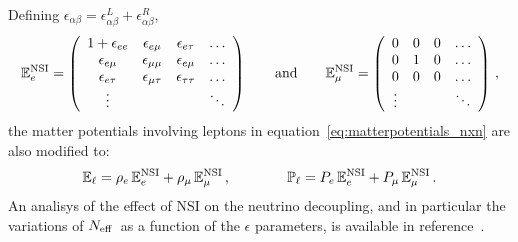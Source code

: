 \documentclass[notitlepage,nofootinbib,showpacs,preprintnumbers,amsmath,amssymb,superscriptaddress,prd,onecolumn]{revtex4-1}
\newcommand{\Neff}{\ensuremath{N_{\rm eff}}}
\begin{document}
Defining $\epsilon_{\alpha\beta}=\epsilon^{L}_{\alpha\beta}+\epsilon^{R}_{\alpha\beta}$,
\begin{equation}
\label{eq:E_nsi_emu}
\mathbb{E}_e^{\rm NSI}
=
\left(
\begin{array}{cccc}
1+\epsilon_{ee} & \epsilon_{e\mu} & \epsilon_{e\tau} &\ldots \\
\epsilon_{e\mu} & \epsilon_{\mu\mu} & \epsilon_{e\mu} &\ldots \\
\epsilon_{e\tau} & \epsilon_{\mu\tau} & \epsilon_{\tau\tau} &\ldots \\
\vdots&&&\ddots
\end{array}
\right)
\qquad
\text{and}
\qquad
\mathbb{E}_\mu^{\rm NSI}
=
\left(
\begin{array}{cccc}
0 & 0 & 0 &\ldots \\
0 & 1 & 0 &\ldots \\
0 & 0 & 0 &\ldots \\
\vdots&&&\ddots
\end{array}
\right)
\,,
\end{equation}
the matter potentials involving leptons in equation~\eqref{eq:matterpotentials_nxn}
are also modified to:
\begin{equation}
\label{eq:leptonmatterpotentials_nxn_nsi}
\mathbb{E}_\ell
=
\rho_e\,
\mathbb{E}_e^{\rm NSI}
+
\rho_\mu\,
\mathbb{E}_\mu^{\rm NSI}
\,,
\qquad
\qquad
\mathbb{P}_\ell
=
P_e\,
\mathbb{E}_e^{\rm NSI}
+
P_\mu\,
\mathbb{E}_\mu^{\rm NSI}
\,.
\end{equation}
An analisys of the effect of NSI on the neutrino decoupling, and in particular the variations of \Neff\ as a function of the $\epsilon$ parameters, is available in reference~\cite{deSalas:2021aeh}.
\end{document}
